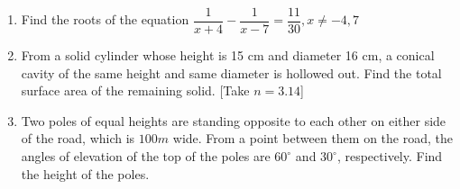 \documentclass[12pt,-letter paper]{article}
\theoremstyle{remark}
\begin{document}
\begin{enumerate}
   \item Find the roots of the equation $\dfrac{1}{x+4}-\dfrac{1}{x-7}=\dfrac{11}{30}, x\neq -4,7$
   \item From a solid cylinder whose height is 15 cm and diameter 16 cm, a conical cavity of the same height and same diameter is hollowed out. Find the total surface area of the remaining solid. [Take $n=3.14$]
   \item Two poles of equal heights are standing opposite to each other on either side of the road, which is $100m$ wide. From a point between them on the road, the angles of elevation of the top of the poles are $60^\circ$ and $30^\circ$, respectively. Find the height of the poles.
\end{enumerate}
\end{document}
